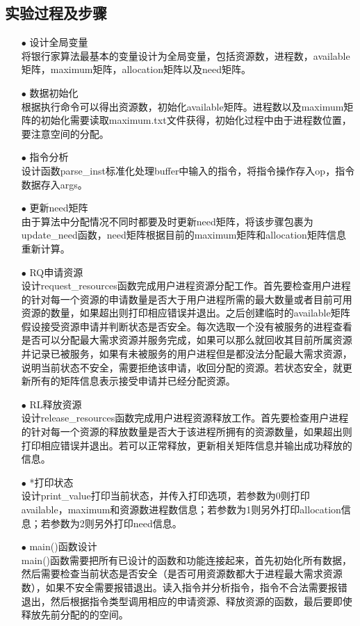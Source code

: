 \documentclass{article}
\begin{document}
\subsection{实验过程及步骤}
\begin{itemize}
\item[$\bullet$]设计全局变量\\
将银行家算法最基本的变量设计为全局变量，包括资源数，进程数，available矩阵，maximum矩阵，allocation矩阵以及need矩阵。
\item[$\bullet$]数据初始化\\
根据执行命令可以得出资源数，初始化available矩阵。进程数以及maximum矩阵的初始化需要读取maximum.txt文件获得，初始化过程中由于进程数位置，要注意空间的分配。
\item[$\bullet$]指令分析\\
设计函数parse\_inst标准化处理buffer中输入的指令，将指令操作存入op，指令数据存入args。
\item[$\bullet$]更新need矩阵\\
由于算法中分配情况不同时都要及时更新need矩阵，将该步骤包裹为update\_need函数，need矩阵根据目前的maximum矩阵和allocation矩阵信息重新计算。
\item[$\bullet$]RQ申请资源\\
设计request\_resources函数完成用户进程资源分配工作。首先要检查用户进程的针对每一个资源的申请数量是否大于用户进程所需的最大数量或者目前可用资源的数量，如果超出则打印相应错误并退出。之后创建临时的available矩阵假设接受资源申请并判断状态是否安全。每次选取一个没有被服务的进程查看是否可以分配最大需求资源并服务完成，如果可以那么就回收其目前所属资源并记录已被服务，如果有未被服务的用户进程但是都没法分配最大需求资源，说明当前状态不安全，需要拒绝该申请，收回分配的资源。若状态安全，就更新所有的矩阵信息表示接受申请并已经分配资源。
\item[$\bullet$]RL释放资源\\
设计release\_resources函数完成用户进程资源释放工作。首先要检查用户进程的针对每一个资源的释放数量是否大于该进程所拥有的资源数量，如果超出则打印相应错误并退出。若可以正常释放，更新相关矩阵信息并输出成功释放的信息。
\item[$\bullet$]*打印状态\\
设计print\_value打印当前状态，并传入打印选项，若参数为0则打印available，maximum和资源数进程数信息；若参数为1则另外打印allocation信息；若参数为2则另外打印need信息。
\item[$\bullet$]main()函数设计\\
main()函数需要把所有已设计的函数和功能连接起来，首先初始化所有数据，然后需要检查当前状态是否安全（是否可用资源数都大于进程最大需求资源数），如果不安全需要报错退出。读入指令并分析指令，指令不合法需要报错退出，然后根据指令类型调用相应的申请资源、释放资源的函数，最后要即使释放先前分配的的空间。
\end{itemize}
\end{document}
